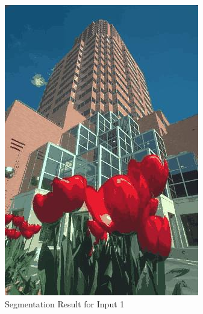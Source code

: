 \documentclass{gapd}
\begin{document}
\begin{figure}[ht]
{\begin{minipage}[t]{0.5\columnwidth}
	\includegraphics[width=\textwidth]{graph/gaussian_output_input1_30}
	\end{minipage}
	}
	\caption{Segmentation Result for Input 1}
	\label{fig:input1_result}
\end{figure}
\end{document}
